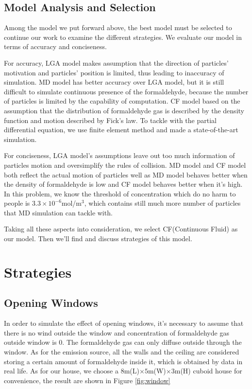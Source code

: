 \documentclass{mcmthesis}
\begin{document}
\subsection{Model Analysis and Selection}
Among the model we put forward above, the best model must be selected to continue our work to examine the different strategies. We evaluate our model in terms of accuracy and conciseness.

For accuracy, LGA model makes assumption that the direction of particles' motivation and particles' position is limited, thus leading to inaccuracy of simulation. MD model has better accuracy over LGA model, but it is still difficult to simulate continuous presence of the formaldehyde, because the number of particles is limited by the capability of computation. CF model based on the assumption that the distribution of formaldehyde gas is described by the density function and motion described by Fick's law. To tackle with the partial differential equation, we use finite element method and made a state-of-the-art simulation.

For conciseness, LGA model's assumptions leave out too much information of particles motion and oversimplify the rules of collision. MD model and CF model both reflect the actual motion of particles well as MD model behaves better when the density of formaldehyde is low and CF model behaves better when it's high. In this problem, we know the threshold of concentration which do no harm to people is $3.3\times10^{-6}$mol/m$^3$, which contains still much more number of particles that MD simulation can tackle with.

Taking all these aspects into consideration, we select CF(Continuous Fluid) as our model. Then we'll find and discuss strategies of this model.

\section{Strategies}
\subsection{Opening Windows}

In order to simulate the effect of opening windows, it's necessary to assume that there is no wind outside the window and concentration of formaldehyde gas outside window is $0$. The formaldehyde gas can only diffuse outside through the window. As for the emission source, all the walls and the ceiling are considered storing a certain amount of formaldehyde inside it, which is obtained by data in real life. As for our house, we choose a $8$m(L)$\times 5$m(W)$\times 3$m(H) cuboid house for convenience, the result are shown in Figure \ref{fig:window}
\end{document}
